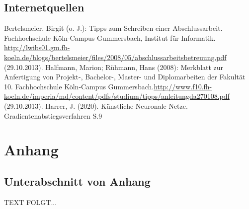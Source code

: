 \documentclass[a4paper,12pt,oneside]{article}
\begin{document}
     \subsection{Internetquellen}
     \begin{thebibliography}{HR08} %
       Bertelsmeier, Birgit (o. J.): Tipps zum Schrei\-b\-en ei\-n\-er Ab\-sch\-luss\-ar\-beit. Fach\-hoch\-schu\-le Köln-Campus Gummersbach, Institut für Informatik. \url{http://lwibs01.gm.fh-koeln.de/blogs/bertelsmeier/files/2008/05/abschlussarbeitsbetreuung.pdf} (29.10.2013).
         Halfmann, Marion; Rühmann, Hans (2008): Merkblatt zur Anfertigung von Projekt-, Bachelor-, Master- und Diplomarbeiten der Fakultät 10. Fachhochschule Köln-Campus Gummersbach.\url{http://www.f10.fh-koeln.de/imperia/md/content/pdfs/studium/tipps/anleitungda270108.pdf} (29.10.2013).
         Harrer, J. (2020). Künstliche Neuronale Netze. Gradientenabstiegsverfahren S.9
      \end{thebibliography} 
  

  \newpage
  \setcounter{section}{0} %
  \renewcommand*\thesection{\Alph{section}} %
  \section{Anhang}\label{anhang}
    \subsection{Unterabschnitt von Anhang}\label{subsec_UabsAnhang}
    TEXT FOLGT...
  
  \newpage
  
 \pagestyle{empty}
\end{document}
